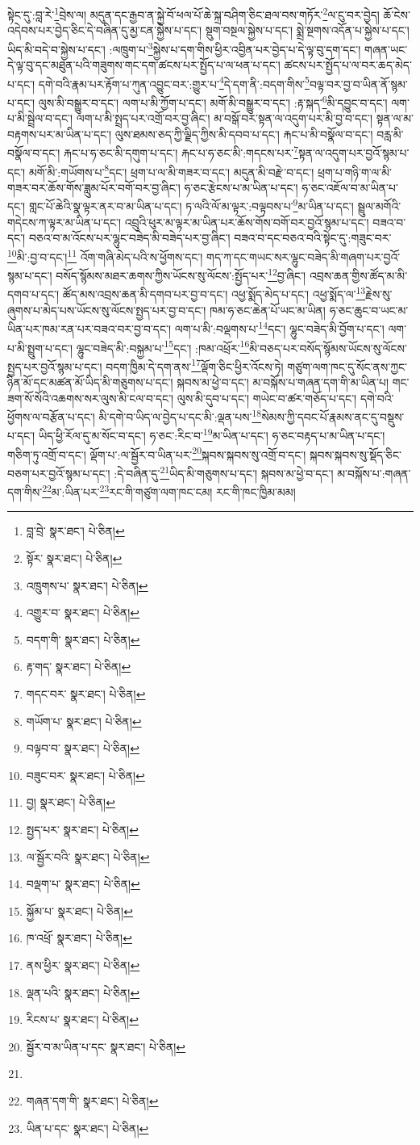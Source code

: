 སྟེང་དུ་:བླ་རེ་\footnote{བླ་བྲེ་  སྣར་ཐང་།  པེ་ཅིན། }བྲེས་ལ། མདུན་དང་རྒྱབ་ན་སྐྱེ་བོ་ཕལ་པོ་ཆེ་སྐྲ་བཤིག་ཅིང་ཐལ་བས་གཏོར་\footnote{སྟོར་  སྣར་ཐང་།  པེ་ཅིན། }ལ་ངུ་བར་བྱེད། ཆོ་ངེས་འདེབས་པར་བྱེད་ཅིང་དེ་བཞིན་དུ་མྱ་ངན་སྐྱེས་པ་དང་། སྡུག་བསྔལ་སྐྱེས་པ་དང་། སྨྲེ་སྔགས་འདོན་པ་སྐྱེས་པ་དང་། ཡིད་མི་བདེ་བ་སྐྱེས་པ་དང་། :ལཁྲུག་པ་\footnote{འཁྲུགས་པ་  སྣར་ཐང་།  པེ་ཅིན། }སྐྱེས་པ་དག་གིས་ཕྱིར་འབྱིན་པར་བྱེད་པ་དེ་ལྟ་བུ་དག་དང་། གཞན་ཡང་དེ་ལྟ་བུ་དང་མཐུན་པའི་གཟུགས་གང་དག་ཚངས་པར་སྤྱོད་པ་ལ་ཕན་པ་དང་། ཚངས་པར་སྤྱོད་པ་ལ་བར་ཆད་མེད་པ་དང་། དགེ་བའི་རྣམ་པར་རྟོག་པ་ཀུན་འབྱུང་བར་:གྱུར་པ་\footnote{འགྱུར་བ་  སྣར་ཐང་།  པེ་ཅིན། }དེ་དག་ནི་:བདག་གིས་\footnote{བདག་གི་  སྣར་ཐང་།  པེ་ཅིན། }བལྟ་བར་བྱ་བ་ཡིན་ནོ་སྙམ་པ་དང་། ལུས་མི་བསྒྱུར་བ་དང་། ལག་པ་མི་ཀྱོག་པ་དང་། མགོ་མི་བསྒྱུར་བ་དང་། :རྟ་སྐད་\footnote{རྟ་གད་  སྣར་ཐང་།  པེ་ཅིན། }མི་དབྱུང་བ་དང་། ལག་པ་མི་སྦྲེལ་བ་དང་། ལག་པ་མི་སྤྲད་པར་འགྲོ་བར་བྱ་ཞིང་། མ་བསྒོ་བར་སྟན་ལ་འདུག་པར་མི་བྱ་བ་དང་། སྟན་ལ་མ་བརྟགས་པར་མ་ཡིན་པ་དང་། ལུས་ཐམས་ཅད་ཀྱི་ལྗིད་ཀྱིས་མི་དབབ་པ་དང་། རྐང་པ་མི་བསྣོལ་བ་དང་། བརླ་མི་བསྣོལ་བ་དང་། རྐང་པ་ཧ་ཅང་མི་དགུག་པ་དང་། རྐང་པ་ཧ་ཅང་མི་:གདངས་པར་\footnote{གདང་བར་  སྣར་ཐང་།  པེ་ཅིན། }སྟན་ལ་འདུག་པར་བྱའོ་སྙམ་པ་དང་། མགོ་མི་:གཡོགས་པ་\footnote{གཡོག་པ་  སྣར་ཐང་།  པེ་ཅིན། }དང་། ཕྲག་པ་ལ་མི་གཟར་བ་དང་། མདུན་མི་བརྫེ་བ་དང་། ཕྲག་པ་གཉི་ག་ལ་མི་གཟར་བར་ཆོས་གོས་ཟླུམ་པོར་བགོ་བར་བྱ་ཞིང་། ཧ་ཅང་རྩེངས་པ་མ་ཡིན་པ་དང་། ཧ་ཅང་འཇོལ་བ་མ་ཡིན་པ་དང་། གླང་པོ་ཆེའི་སྣ་ལྟར་ནར་བ་མ་ཡིན་པ་དང་། ཏ་ལའི་ལོ་མ་ལྟར་:བལྟབས་པ་\footnote{བལྟབ་བ་  སྣར་ཐང་།  པེ་ཅིན། }མ་ཡིན་པ་དང་། སྦྲུལ་མགོའི་གདེངས་ཀ་ལྟར་མ་ཡིན་པ་དང་། འབྲུའི་ཕུར་མ་ལྟར་མ་ཡིན་པར་ཆོས་གོས་བགོ་བར་བྱའོ་སྙམ་པ་དང་། བཟའ་བ་དང་། བཅའ་བ་མ་འོངས་པར་ལྷུང་བཟེད་མི་བཟེད་པར་བྱ་ཞིང་། བཟའ་བ་དང་བཅའ་བའི་སྟེང་དུ་:གཟུང་བར་\footnote{བཟུང་བར་  སྣར་ཐང་།  པེ་ཅིན། }མི་:བྱ་བ་དང་།\footnote{བྱ།  སྣར་ཐང་།  པེ་ཅིན། } འོག་གཞི་མེད་པའི་ས་ཕྱོགས་དང་། གད་ཀ་དང་གཡང་སར་ལྷུང་བཟེད་མི་གཞག་པར་བྱའོ་སྙམ་པ་དང་། བསོད་སྙོམས་མཐར་ཆགས་ཀྱིས་ཡོངས་སུ་ལོངས་:སྤྱོད་པར་\footnote{སྤྱད་པར་  སྣར་ཐང་།  པེ་ཅིན། }བྱ་ཞིང་། འབྲས་ཆན་གྱིས་ཚོད་མ་མི་དགབ་པ་དང་། ཚོད་མས་འབྲས་ཆན་མི་དགབ་པར་བྱ་བ་དང་། འཕྱ་སྨོད་མེད་པ་དང་། འཕྱ་སྨོད་ལ་\footnote{ལ་སྦྱོར་བའི་  སྣར་ཐང་།  པེ་ཅིན། }རྗེས་སུ་ཞུགས་པ་མེད་པས་ཡོངས་སུ་ལོངས་སྤྱད་པར་བྱ་བ་དང་། ཁམ་ཧ་ཅང་ཆེན་པོ་ཡང་མ་ཡིན། ཧ་ཅང་ཆུང་བ་ཡང་མ་ཡིན་པར་ཁམ་རན་པར་བཟའ་བར་བྱ་བ་དང་། ལག་པ་མི་:བལྡགས་པ་\footnote{བལྡག་པ་  སྣར་ཐང་།  པེ་ཅིན། }དང་། ལྷུང་བཟེད་མི་བྱོག་པ་དང་། ལག་པ་མི་སྤྲུག་པ་དང་། ལྷུང་བཟེད་མི་:བསྐྱམ་པ་\footnote{སྐྱོམ་པ་  སྣར་ཐང་།  པེ་ཅིན། }དང་། :ཁམ་འཕྲོར་\footnote{ཁ་འཕྲོ་  སྣར་ཐང་།  པེ་ཅིན། }མི་བཅད་པར་བསོད་སྙོམས་ཡོངས་སུ་ལོངས་སྤྱད་པར་བྱའོ་སྙམ་པ་དང་། བདག་ཁྱིམ་དེ་དག་ནས་\footnote{ནས་ཕྱིར་  སྣར་ཐང་།  པེ་ཅིན། }ལྡོག་ཅིང་ཕྱིར་འོངས་ཏེ། གཙུག་ལག་ཁང་དུ་སོང་ནས་ཀྱང་ཉིན་མོ་དང་མཚན་མོ་ཡིད་མི་གཅུགས་པ་དང་། སྐབས་མ་ཕྱེ་བ་དང་། མ་བསྐོས་པ་གཞན་དག་གི་མ་ཡིན་པ། གང་ཟག་སོ་སོའི་འཆགས་སར་ལུས་མི་ངལ་བ་དང་། ལུས་མི་དུབ་པ་དང་། གཡེང་བ་ཚར་གཅོད་པ་དང་། དགེ་བའི་ཕྱོགས་ལ་བརྩོན་པ་དང་། མི་དགེ་བ་ཡིད་ལ་བྱེད་པ་དང་མི་:ལྡན་པས་\footnote{ལྡན་པའི་  སྣར་ཐང་།  པེ་ཅིན། }སེམས་ཀྱི་དབང་པོ་རྣམས་ནང་དུ་བསྡུས་པ་དང་། ཡིད་ཕྱི་རོལ་དུ་མ་སོང་བ་དང་། ཧ་ཅང་:རིང་བ་\footnote{རིངས་པ་  སྣར་ཐང་།  པེ་ཅིན། }མ་ཡིན་པ་དང་། ཧ་ཅང་བརྟད་པ་མ་ཡིན་པ་དང་། གཅིག་ཏུ་འགྲོ་བ་དང་། ལྡོག་པ་:ལ་སྦྱོར་བ་ཡིན་པར་\footnote{སྦྱོར་བ་མ་ཡིན་པ་དང་  སྣར་ཐང་།  པེ་ཅིན། }སྐབས་སྐབས་སུ་འགྲོ་བ་དང་། སྐབས་སྐབས་སུ་སྡོད་ཅིང་བཅག་པར་བྱའོ་སྙམ་པ་དང་། :དེ་བཞིན་དུ་\footnote{}ཡིད་མི་གཅུགས་པ་དང་། སྐབས་མ་ཕྱེ་བ་དང་། མ་བསྐོས་པ་:གཞན་དག་གིས་\footnote{གཞན་དག་གི་  སྣར་ཐང་།  པེ་ཅིན། }མ་:ཡིན་པར་\footnote{ཡིན་པ་དང་  སྣར་ཐང་།  པེ་ཅིན། }རང་གི་གཙུག་ལག་ཁང་ངམ། རང་གི་ཁང་ཁྱིམ་མམ། 